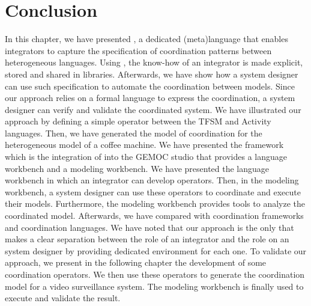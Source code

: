 \section{Conclusion}
In this chapter, we have presented \bcool, a dedicated (meta)language that enables integrators to capture the specification of coordination patterns between heterogeneous languages. Using \bcool, the know-how of an integrator is made explicit, stored and shared in libraries. Afterwards, we have show how a system designer can use such specification to automate the coordination between models. Since our approach relies on a formal language to express the coordination, a system designer can verify and validate the coordinated system. We have illustrated our approach by defining a simple operator between the TFSM and Activity languages. Then, we have generated the model of coordination for the heterogeneous model of a coffee machine. We have presented the \bcool framework which is the integration of \bcool into the GEMOC studio that provides a language workbench and a modeling workbench. We have presented the language workbench in which an integrator can develop \bcool operators. Then, in the modeling workbench, a system designer can use these operators to coordinate and execute their models. Furthermore, the modeling workbench provides tools to analyze the coordinated model. Afterwards, we have compared \bcool with coordination frameworks and coordination languages. We have noted that our approach is the only that makes a clear separation between the role of an integrator and the role on an system designer by providing dedicated environment for each one. To validate our approach, we present in the following chapter the development of some \bcool coordination operators. We then use these operators to generate the coordination model for a video surveillance system. The modeling workbench is finally used to execute and validate the result.

